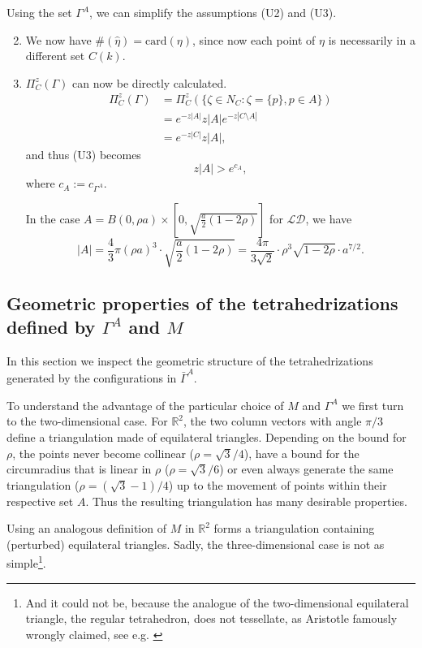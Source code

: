 \begin{remark}\label{r:UA}
	Using the set $\Gamma^A$, we can simplify the assumptions (U2) and (U3).
\begin{enumerate}[(U1)]	
	\setcounter{enumi}{1}
	\item	We now have  $\#(\hat\eta) = \mathrm{card}(\eta)$, since now each point of $\eta$ is necessarily in a different set $C(k)$.

\item $\Pi^z_C(\Gamma)$ can now be directly calculated.
	\begin{align*} 
		\Pi^z_C(\Gamma) &= \Pi^z_C(\{\zeta \in N_C: \zeta = \{p\}, p \in A\}) \\
		& = e^{-z|A|} z |A| e^{-z|C\setminus A|} \\
		& = e^{-z|C|} z |A|,
	\end{align*}
	and thus (U3) becomes
	$$z|A| > e^{c_{A}},$$
	where $c_A := c_{\Gamma^A}$.

	In  the case $A = B(0,\rho a)\times [0, \sqrt{\frac a2(1-2\rho)}]$ for $\mathcal {LD}$, we have
	$$|A| = \frac 43 \pi (\rho a)^3 \cdot \sqrt{\frac a2(1-2\rho)} = \frac {4\pi}{3\sqrt{2}}\cdot  \rho^3 \sqrt{1-2\rho} \cdot a^{7/2}.$$

\end{enumerate}
\end{remark}

\subsection{Geometric properties of the tetrahedrizations defined by $\Gamma^A$ and $M$}
In this section we inspect the geometric structure of the tetrahedrizations generated by the configurations in $\bar \Gamma^A$.

To understand the advantage of the particular choice of $M$ and $\Gamma^A$ we first turn to the two-dimensional case. For $\mathbb R^2$, the two column vectors with angle $\pi/3$ define a triangulation made of equilateral triangles. Depending on the bound for $\rho$, the points never become collinear ($\rho = \sqrt 3/4$), have a bound for the circumradius that is linear in $\rho$ ($\rho = \sqrt 3/6$) or even always generate the same triangulation ($\rho = (\sqrt 3 - 1)/4$) up to the movement of points within their respective set $A$. Thus the resulting triangulation has many desirable properties. \newline

Using an analogous definition of $M$ in $\mathbb R^2$ forms a triangulation containing (perturbed) equilateral triangles. Sadly, the three-dimensional case is not as simple\footnote{And it could not be, because the analogue of the two-dimensional equilateral triangle, the regular tetrahedron, does not tessellate, as Aristotle famously wrongly claimed, see e.g. \cite{Lagarias12}}.

